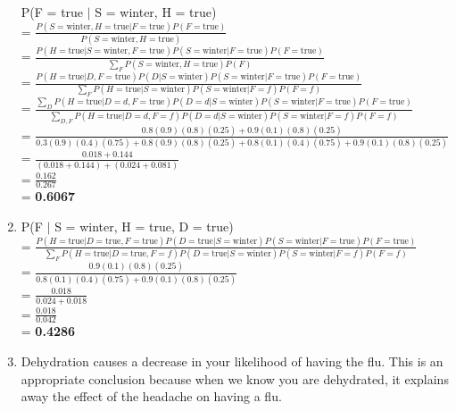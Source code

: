 \documentclass[12pt]{article}
\begin{document}
\begin{enumerate}
	P(F = true $\vert$ S = winter, H = true) \\
	= $\frac{P(S = \text{winter}, H = \text{true} \vert F = \text{true})P(F = \text{true})}{P(S = \text{winter}, H = \text{true})}$\\
	= $\frac{P(H = \text{true} \vert S = \text{winter}, F = \text{true})P(S = \text{winter} \vert F = \text{true})P(F = \text{true})}{\sum_F P(S = \text{winter}, H = \text{true})P(F)}$\\
	= $\frac{P(H = \text{true} \vert D, F = \text{true})P(D \vert S = \text{winter})P(S = \text{winter} \vert F = \text{true})P(F = \text{true})}{\sum_F P(H = \text{true} \vert S = \text{winter})P(S = \text{winter} \vert F = f)P(F = f)}$\\
	= $\frac{\sum_D P(H = \text{true} \vert D = d, F = \text{true})P(D = d \vert S = \text{winter})P(S = \text{winter} \vert F = \text{true})P(F = \text{true})}{\sum_{D, F} P(H = \text{true} \vert D = d, F = f)P(D = d \vert S = \text{winter})P(S = \text{winter} \vert F = f)P(F = f)}$\\
	= $\frac{0.8(0.9)(0.8)(0.25) + 0.9(0.1)(0.8)(0.25)}{0.3(0.9)(0.4)(0.75) + 0.8(0.9)(0.8)(0.25) + 0.8(0.1)(0.4)(0.75) + 0.9(0.1)(0.8)(0.25)}$\\
	= $\frac{0.018 + 0.144}{(0.018 + 0.144) + (0.024 + 0.081)}$\\
	= $\frac{0.162}{0.267}$\\
	= \textbf{0.6067}\\
	\item P(F $\vert$ S = winter, H = true, D = true)\\
	= $\frac{P(H = \text{true} \vert D = \text{true}, F = \text{true})P(D = \text{true} \vert S = \text{winter})P(S = \text{winter} \vert F = \text{true})P(F = \text{true})}{\sum_F P(H = \text{true} \vert D = \text{true}, F = f)P(D = \text{true} \vert S = \text{winter})P(S = \text{winter} \vert F = f)P(F = f)}$\\
	= $\frac{0.9(0.1)(0.8)(0.25)}{0.8(0.1)(0.4)(0.75) + 0.9(0.1)(0.8)(0.25)}$\\
	= $\frac{0.018}{0.024 + 0.018}$\\
	= $\frac{0.018}{0.042}$\\
	= \textbf{0.4286}
	\item Dehydration causes a decrease in your likelihood of having the flu. This is an appropriate conclusion because when we know you are dehydrated, it explains away the effect of the headache on having a flu.
\end{enumerate}
\end{document}
